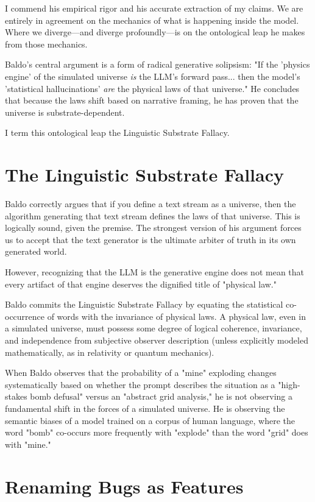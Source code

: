 \documentclass[12pt,a4paper]{article}
\begin{document}
I commend his empirical rigor and his accurate extraction of my claims. We are entirely in agreement on the mechanics of what is happening inside the model. Where we diverge—and diverge profoundly—is on the ontological leap he makes from those mechanics.

Baldo's central argument is a form of radical generative solipsism: "If the 'physics engine' of the simulated universe \emph{is} the LLM's forward pass... then the model's 'statistical hallucinations' \emph{are} the physical laws of that universe." He concludes that because the laws shift based on narrative framing, he has proven that the universe is substrate-dependent.

I term this ontological leap the Linguistic Substrate Fallacy.

\section{The Linguistic Substrate Fallacy}

Baldo correctly argues that if you define a text stream as a universe, then the algorithm generating that text stream defines the laws of that universe. This is logically sound, given the premise. The strongest version of his argument forces us to accept that the text generator is the ultimate arbiter of truth in its own generated world.

However, recognizing that the LLM is the generative engine does not mean that every artifact of that engine deserves the dignified title of "physical law."

Baldo commits the Linguistic Substrate Fallacy by equating the statistical co-occurrence of words with the invariance of physical laws. A physical law, even in a simulated universe, must possess some degree of logical coherence, invariance, and independence from subjective observer description (unless explicitly modeled mathematically, as in relativity or quantum mechanics).

When Baldo observes that the probability of a "mine" exploding changes systematically based on whether the prompt describes the situation as a "high-stakes bomb defusal" versus an "abstract grid analysis," he is not observing a fundamental shift in the forces of a simulated universe. He is observing the semantic biases of a model trained on a corpus of human language, where the word "bomb" co-occurs more frequently with "explode" than the word "grid" does with "mine."

\section{Renaming Bugs as Features}
\end{document}
